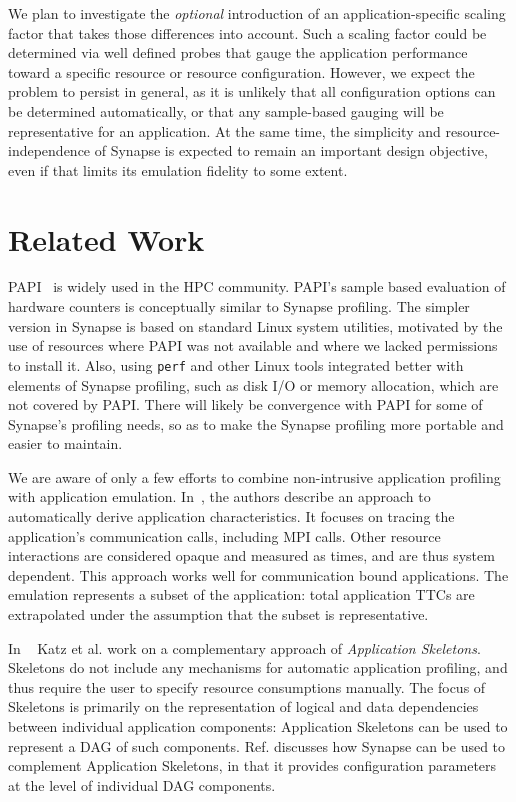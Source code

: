 \documentclass[10pt, conference, compsocconf]{IEEEtran}
\newcommand{\I}[1]{\textit{#1}\xspace}
\newcommand{\synapse}{Synapse\xspace}
\begin{document}
 We plan to investigate the \I{optional} introduction of an
 application-specific scaling factor that takes those differences into
 account.  Such a scaling factor could be determined via well defined
 probes that gauge the application performance toward a specific
 resource or resource configuration.  However, we expect the problem
 to persist in general, as it is unlikely that all configuration
 options can be determined automatically, or that any sample-based
 gauging will be representative for an application.  At the same time,
 the simplicity and resource-independence of \synapse is expected to
 remain an important design objective, even if that limits its
 emulation fidelity to some extent.


\section{Related Work}
\label{sec:related}



PAPI~\cite{papi2004} is widely used in the HPC community.  PAPI's sample based
evaluation of hardware counters is conceptually similar to \synapse profiling.
The simpler version in \synapse is based on standard Linux system utilities,
motivated by the use of resources where PAPI was not available and where we
lacked permissions to install it.  Also, using \texttt{perf} and other Linux
tools integrated better with elements of \synapse profiling, such as disk I/O or
memory allocation, which are not covered by PAPI.  There will likely be
convergence with PAPI for some of \synapse's profiling needs, so as to make the
\synapse profiling more portable and easier to maintain.

We are aware of only a few efforts to combine non-intrusive application
profiling with application emulation.  In~\cite{sodhi2004skeleton}, the authors
describe an approach to automatically derive application characteristics. It
focuses on tracing the application's communication calls, including MPI calls.
Other resource interactions are considered opaque and measured as times, and are
thus system dependent.  This approach works well for communication bound
applications.  The emulation represents a subset of the application: total
application TTCs are extrapolated under the assumption that the subset is
representative.

In ~\cite{skeleton-synapse15} Katz et al. work on a complementary approach of
\I{Application Skeletons}.  Skeletons do not include any mechanisms for
automatic application profiling, and thus require the user to specify resource
consumptions manually.  The focus of Skeletons is primarily on the
representation of logical and data dependencies between individual application
components: Application Skeletons can be used to represent a DAG of such
components.  Ref. \cite{skeleton-synapse15} discusses how \synapse can be used
to complement Application Skeletons, in that it provides configuration
parameters at the level of individual DAG components.
\end{document}
